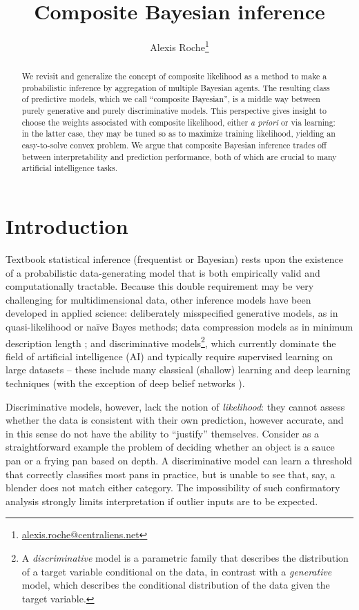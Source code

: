 \documentclass[english]{scrartcl}
\title{Composite Bayesian inference}
\author{Alexis Roche\thanks{\url{alexis.roche@centraliens.net}}}
\begin{document}
\maketitle

\begin{abstract}
We revisit and generalize the concept of composite likelihood as a method to make a probabilistic inference by aggregation of multiple Bayesian agents. The resulting class of predictive models, which we call ``composite Bayesian'', is a middle way between purely generative and purely discriminative models. This perspective gives insight to choose the weights associated with composite likelihood, either {\em a priori} or via learning: in the latter case, they may be tuned so as to maximize training likelihood, yielding an easy-to-solve convex problem. We argue that composite Bayesian inference trades off between interpretability and prediction performance, both of which are crucial to many artificial intelligence tasks.
\end{abstract}


\section{Introduction}
\label{sec:intro}

Textbook statistical inference (frequentist or Bayesian) rests upon the existence of a probabilistic data-generating model that is both empirically valid and computationally tractable. Because this double requirement may be very challenging for multidimensional data, other inference models have been developed in applied science: deliberately misspecified generative models, as in quasi-likelihood \cite{White-82,Walker-13} or na\"ive Bayes \cite{Ng-01} methods; data compression models as in minimum description length \cite{Grunwald-07}; and discriminative models\footnote{A {\em discriminative} model is a parametric family that describes the distribution of a target variable conditional on the data, in contrast with a {\em generative} model, which describes the conditional distribution of the data given the target variable.}, which currently dominate the field of artificial intelligence (AI) and typically require supervised learning on large datasets -- these include many classical (shallow) learning \cite{Ho-95,BergerA-96,Vapnik-00,Rasmussen-06} and deep learning \cite{Lecun-15,Goodfellow-16} techniques (with the exception of deep belief networks \cite{Hinton-06}).

Discriminative models, however, lack the notion of {\em likelihood}: they cannot assess whether the data is consistent with their own prediction, however accurate, and in this sense do not have the ability to ``justify'' themselves. Consider as a straightforward example the problem of deciding whether an object is a sauce pan or a frying pan based on depth. A discriminative model can learn a threshold that correctly classifies most pans in practice, but is unable to see that, say, a blender does not match either category. The impossibility of such confirmatory analysis strongly limits interpretation if outlier inputs are to be expected.
\end{document}
